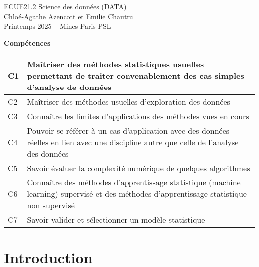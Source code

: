 \documentclass[french,11pt,openany]{book}
\begin{document}
\setlength{\abovedisplayskip}{5pt}
\setlength{\belowdisplayskip}{3pt}


\renewcommand{\bibname}{}


\begin{center}
  
  \hfill

  \vfill
  
  \LARGE 
  ECUE21.2 Science des données (DATA)\\ 
  
  \Large
  Chloé-Agathe Azencott  et Emilie Chautru \\

  Printemps 2025 -- Mines Paris PSL

  \vfill

  \large
  \textbf{Compétences} 


  \begin{tabular}[h]{|p{}|p{}|}
    \hline
    C1 & Maîtriser des méthodes statistiques usuelles permettant de traiter convenablement des cas simples d'analyse de données \\ \hline
    C2 & Maîtriser des méthodes usuelles d'exploration des données \\ \hline
    C3 &  Connaître les limites d'applications des méthodes vues en cours \\ \hline
    C4 & Pouvoir se référer à un cas d'application avec des données réelles en lien avec une discipline autre que celle de l'analyse des données \\ \hline
    C5 & Savoir évaluer la complexité numérique de quelques algorithmes \\ \hline
    C6 & Connaître des méthodes d'apprentissage statistique (machine learning) supervisé et des méthodes d'apprentissage statistique non supervisé \\ \hline
    C7 & Savoir valider et sélectionner un modèle statistique \\ \hline
  \end{tabular}

  \vfill

\end{center}
\clearpage

\tableofcontents
\clearpage


\chapter{Introduction}

\end{document}

